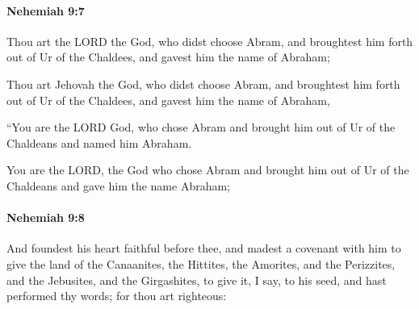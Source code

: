 		\paragraph{Nehemiah 9:7} %
			\label{NEHEMIAH-9-7}

			Thou art the LORD the God, who didst choose Abram, and broughtest him forth out of Ur of the Chaldees, and gavest him the name of Abraham;

			\begin{versebox}
					\item[BHS] 
					\item[LXX] 
					\item[ASV] Thou art Jehovah the God, who didst choose Abram, and broughtest him forth out of Ur of the Chaldees, and gavest him the name of Abraham,
					\item[NIV] “You are the LORD God, who chose Abram and brought him out of Ur of the Chaldeans and named him Abraham.
					\item[NRSV] You are the LORD, the God who chose Abram and brought him out of Ur of the Chaldeans and gave him the name Abraham;
			\end{versebox}

		\paragraph{Nehemiah 9:8} %
			\label{NEHEMIAH-9-8}

			And foundest his heart faithful before thee, and madest a covenant with him to give the land of the Canaanites, the Hittites, the Amorites, and the Perizzites, and the Jebusites, and the Girgashites, to give it, I say, to his seed, and hast performed thy words; for thou art righteous:

